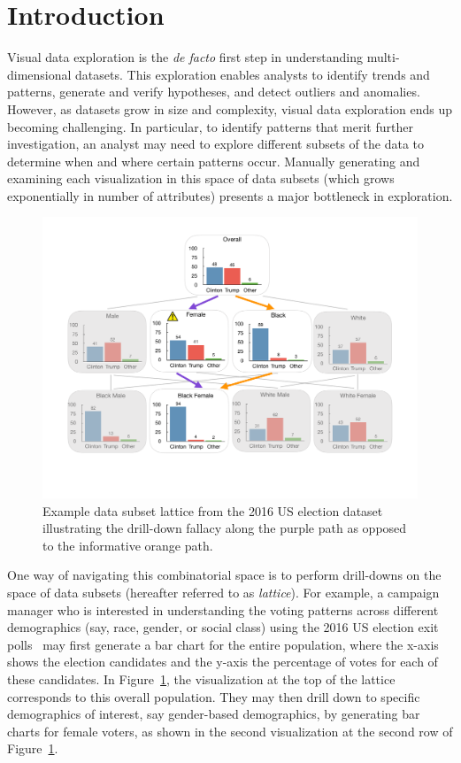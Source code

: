 \section{Introduction}
\par Visual data exploration is the \emph{de facto} first step in understanding multi-dimensional datasets. This exploration enables analysts to identify trends and patterns, generate and verify hypotheses, and detect outliers and anomalies. However, as datasets grow in size and complexity, visual data exploration ends up becoming challenging. In particular, to identify patterns that merit further investigation, an analyst may need to explore different subsets of the data to determine when and where certain patterns occur. Manually generating and examining each visualization in this space of data subsets (which grows exponentially in number of attributes) presents a major bottleneck in exploration.
\begin{figure}[ht!]
\includegraphics[width=\linewidth]{figures/elections_example_lattice_teaser.pdf}
\caption{Example data subset lattice from the 2016 US election dataset illustrating the drill-down fallacy along the purple path as opposed to the informative orange path.}
\label{fig:elections_example}
\end{figure}
\par One way of navigating this combinatorial space is to perform drill-downs on the space of data subsets (hereafter referred to as \emph{lattice}). For example, a campaign manager who is interested in understanding the voting patterns across different demographics (say, race, gender, or social class) using the 2016 US election exit polls~\cite{exitpolls} may first generate a bar chart for the entire population, where the x-axis shows the election candidates and the y-axis the percentage of votes for each of these candidates. In Figure~\ref{fig:elections_example}, the visualization at the top of the lattice corresponds to this overall population. They may then drill down to specific demographics of interest, say gender-based demographics, by generating bar charts for female voters, as shown in the second visualization at the second row of Figure~\ref{fig:elections_example}.
